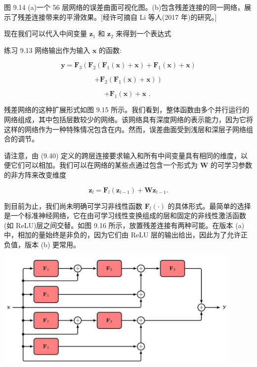 \documentclass[10pt]{article}
\begin{document}
图 9.14 (a)一个 56 层网络的误差曲面可视化图。(b)包含残差连接的同一网络，展示了残差连接带来的平滑效果。[经许可摘自 Li 等人(2017 年)的研究。]

现在我们可以代入中间变量 \({\mathbf{z}}_{1}\) 和 \({\mathbf{z}}_{2}\) 来得到一个表达式

练习 9.13 网络输出作为输入 \(\mathbf{x}\) 的函数:

\[
\mathbf{y} = {\mathbf{F}}_{3}\left( {{\mathbf{F}}_{2}\left( {{\mathbf{F}}_{1}\left( \mathbf{x}\right)  + \mathbf{x}}\right)  + {\mathbf{F}}_{1}\left( \mathbf{x}\right)  + \mathbf{x}}\right)
\]

\[
\left. {+{\mathbf{F}}_{2}\left( {{\mathbf{F}}_{1}\left( \mathbf{x}\right)  + \mathbf{x}}\right) }\right)
\]

\[
+ {\mathbf{F}}_{1}\left( \mathbf{x}\right)  + \mathbf{x}\text{ . } \tag{9.40}
\]

残差网络的这种扩展形式如图 9.15 所示。我们看到，整体函数由多个并行运行的网络组成，其中包括层数较少的网络。该网络具有深度网络的表示能力，因为它将这样的网络作为一种特殊情况包含在内。然而，误差曲面受到浅层和深层子网络组合的调节。

请注意，由 (9.40) 定义的跨层连接要求输入和所有中间变量具有相同的维度，以便它们可以相加。我们可以在网络的某些点通过包含一个形式为 \(\mathbf{W}\) 的可学习参数的非方阵来改变维度

\[
{\mathbf{z}}_{l} = {\mathbf{F}}_{l}\left( {\mathbf{z}}_{l - 1}\right)  + \mathbf{W}{\mathbf{z}}_{l - 1}. \tag{9.41}
\]

到目前为止，我们尚未明确可学习非线性函数 \({\mathbf{F}}_{l}\left( \cdot \right)\) 的具体形式。最简单的选择是一个标准神经网络，它在由可学习线性变换组成的层和固定的非线性激活函数(如 ReLU)层之间交替。如图 9.16 所示，放置残差连接有两种可能。在版本 (a) 中，相加的量始终是非负的，因为它们由 ReLU 层的输出给出，因此为了允许正负值，版本 (b) 更常用。

\begin{center}
\includegraphics[max width=0.9\textwidth]{images/0194e279-9b28-703a-88f4-c3ac21e2010d_296_313_340_1167_555_0.jpg}
\end{center}
\hspace*{3em} 
\end{document}
